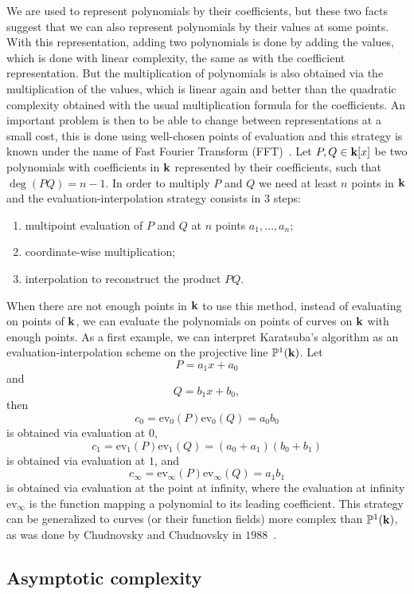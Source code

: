 We are used to represent polynomials by their coefficients, but these two facts
suggest that we can also represent polynomials by their values at some points.
With this representation, adding two polynomials is done by adding the
values, which is done with linear complexity, the same as with the coefficient
representation. But the multiplication of polynomials is also obtained via the
multiplication of the values, which is linear again and better than the
quadratic complexity obtained with the usual multiplication formula for the
coefficients. An important problem is then to be able to change between
representations at a small cost, this is done using well-chosen points of
evaluation and this strategy is known under the name of Fast Fourier
Transform (FFT)~\cite{GG13}. Let $P, Q\in\mathbf{k}[x]$ be two polynomials with
coefficients in $\mathbf{k}$ represented by their coefficients, such that
$\deg(PQ)=n-1$. In order to multiply $P$ and $Q$ we need at least $n$ points in
$\mathbf{k}$ and the evaluation-interpolation strategy consists in $3$ steps:
\begin{enumerate}
  \item multipoint evaluation of $P$ and $Q$ at $n$ points $a_1, \dots, a_n$;
  \item coordinate-wise multiplication;
  \item interpolation to reconstruct the product $PQ$.
\end{enumerate}
When there are not enough points in $\mathbf{k}$ to use this method, instead of
evaluating on points of $\mathbf{k}$, we can evaluate the polynomials on points of
curves on $\mathbf{k}$ with enough points. As a first example, we can interpret
Karatsuba's algorithm as an evaluation-interpolation scheme on
the projective line $\mathbb{P}^1(\mathbf{k})$. Let 
\[
  P = a_1 x + a_0
\]
and 
\[
  Q = b_1 x + b_0,
\]
then
\[
  c_0 = \textrm{ev}_0(P)\textrm{ev}_0(Q) = a_0b_0
\]
is obtained via evaluation at $0$,
\[
  c_1 = \textrm{ev}_1(P)\textrm{ev}_1(Q) = (a_0+a_1)(b_0+b_1)
\]
is obtained via evaluation at $1$, and
\[
  c_\infty = \textrm{ev}_\infty(P)\textrm{ev}_\infty(Q) = a_1b_1
\]
is obtained via evaluation at the point at infinity, where the evaluation at
infinity $\textrm{ev}_{\infty}$ is the function mapping a polynomial to its
leading coefficient. This strategy can be generalized to curves (or their
function fields) more complex
than $\mathbb{P}^1(\mathbf{k})$, as was done by Chudnovsky and Chudnovsky in
$1988$~\cite{CC88}.

\subsection{Asymptotic complexity}

